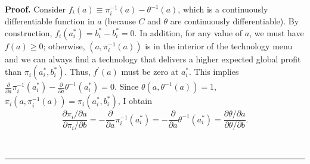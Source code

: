 \documentclass[notitlepage,11pt]{article}%
\newenvironment{proof}[1][Proof]{\noindent \textbf{#1.} }{\  \rule{0.5em}{0.5em}}
\begin{document}
\begin{proof}
Consider $f_{i}\left(  a\right)  \equiv\pi_{i}^{-1}\left(  a\right)
-\theta^{-1}\left(  a\right)  $, which is a continuously differentiable
function in $a$ (because $C$ and $\theta$ are continuously differentiable). By
construction, $f_{i}\left(  a_{i}^{\ast}\right)  =b_{i}^{\ast}-b_{i}^{\ast}%
=0$. In addition, for any value of $a$, we must have $f\left(  a\right)
\geq0$; otherwise, $\left(  a,\pi_{i}^{-1}\left(  a\right)  \right)  $ is in
the interior of the technology menu and we can always find a technology that
delivers a higher expected global profit than $\pi_{i}\left(  a_{i}^{\ast
},b_{i}^{\ast}\right)  $. Thus, $f^{\prime}\left(  a\right)  $ must be zero at
$a_{i}^{\ast}$. This implies $\frac{\partial}{\partial a}\pi_{i}^{-1}\left(
a_{i}^{\ast}\right)  -\frac{\partial}{\partial a}\theta^{-1}\left(
a_{i}^{\ast}\right)  =0$. Since $\theta\left(  a,\theta^{-1}\left(  a\right)
\right)  =1$, $\pi_{i}\left(  a,\pi_{i}^{-1}\left(  a\right)  \right)
=\pi_{i}\left(  a_{i}^{\ast},b_{i}^{\ast}\right)  $, I obtain%
\[
\frac{\partial\pi_{i}/\partial a}{\partial\pi_{i}/\partial b}=-\frac{\partial
}{\partial a}\pi_{i}^{-1}\left(  a_{i}^{\ast}\right)  =-\frac{\partial
}{\partial a}\theta^{-1}\left(  a_{i}^{\ast}\right)  =\frac{\partial
\theta/\partial a}{\partial\theta/\partial b}.
\]

\end{proof}
\end{document}
